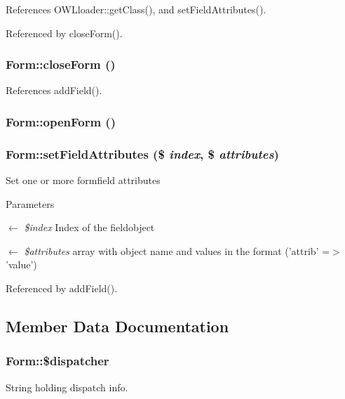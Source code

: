 References OWLloader::getClass(), and setFieldAttributes().



Referenced by closeForm().

\subsubsection[{closeForm}]{\setlength{\rightskip}{0pt plus 5cm}Form::closeForm ()}\label{classForm_a9bb2df9ed7b866b0dc4b29b3874c2a1a}


References addField().

\subsubsection[{openForm}]{\setlength{\rightskip}{0pt plus 5cm}Form::openForm ()}\label{classForm_a94902cc2869e1608247d9204036af7d1}
\subsubsection[{setFieldAttributes}]{\setlength{\rightskip}{0pt plus 5cm}Form::setFieldAttributes (\$ {\em index}, \/  \$ {\em attributes})}\label{classForm_a83cd5bed7649ecfe202dd97a8129f6f8}
Set one or more formfield attributes 
\begin{DoxyParams}{Parameters}
\item[\mbox{$\leftarrow$} {\em \$index}]Index of the fieldobject \item[\mbox{$\leftarrow$} {\em \$attributes}]array with object name and values in the format ('attrib' =$>$ 'value') \end{DoxyParams}


Referenced by addField().



\subsection{Member Data Documentation}
\subsubsection[{\$dispatcher}]{\setlength{\rightskip}{0pt plus 5cm}Form::\$dispatcher}\label{classForm_ab02292e715af1dc9b0499dd20900aa92}
String holding dispatch info. 


